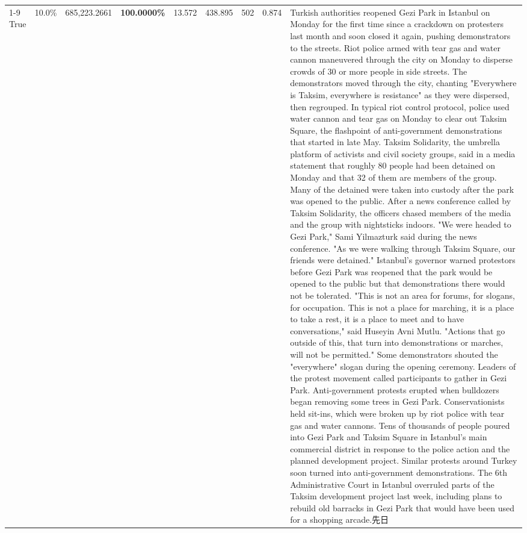 \begin{table}[H]
\begin{tabular}{lllrlllll}
\cline{1-9}
True & 10.0\% & 685,223.2661 & \bfseries \color{red} 100.0000\% & 13.572 & 438.895 & 502 & 0.874 & Turkish authorities reopened Gezi Park in Istanbul on Monday for the first time since a crackdown on protesters last month and soon closed it again, pushing demonstrators to the streets. Riot police armed with tear gas and water cannon maneuvered through the city on Monday to disperse crowds of 30 or more people in side streets. The demonstrators moved through the city, chanting "Everywhere is Taksim, everywhere is resistance" as they were dispersed, then regrouped. In typical riot control protocol, police used water cannon and tear gas on Monday to clear out Taksim Square, the flashpoint of anti-government demonstrations that started in late May. Taksim Solidarity, the umbrella platform of activists and civil society groups, said in a media statement that roughly 80 people had been detained on Monday and that 32 of them are members of the group. Many of the detained were taken into custody after the park was opened to the public. After a news conference called by Taksim Solidarity, the officers chased members of the media and the group with nightsticks indoors. "We were headed to Gezi Park," Sami Yilmazturk said during the news conference. "As we were walking through Taksim Square, our friends were detained." Istanbul's governor warned protestors before Gezi Park was reopened that the park would be opened to the public but that demonstrations there would not be tolerated. "This is not an area for forums, for slogans, for occupation. This is not a place for marching, it is a place to take a rest, it is a place to meet and to have conversations," said Huseyin Avni Mutlu. "Actions that go outside of this, that turn into demonstrations or marches, will not be permitted." Some demonstrators shouted the "everywhere" slogan during the opening ceremony. Leaders of the protest movement called participants to gather in Gezi Park. Anti-government protests erupted when bulldozers began removing some trees in Gezi Park. Conservationists held sit-ins, which were broken up by riot police with tear gas and water cannons. Tens of thousands of people poured into Gezi Park and Taksim Square in Istanbul's main commercial district in response to the police action and the planned development project. Similar protests around Turkey soon turned into anti-government demonstrations. The 6th Administrative Court in Istanbul overruled parts of the Taksim development project last week, including plans to rebuild old barracks in Gezi Park that would have been used for a shopping arcade.先日 \\

\end{tabular}
\end{table}
